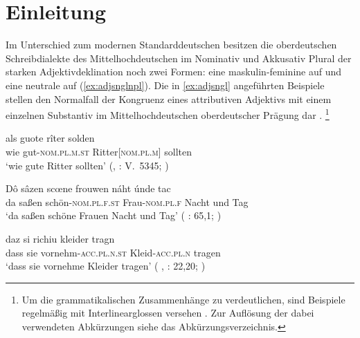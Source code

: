 \chapter{Einleitung}
\label{ch:einleitung}

Im Unterschied zum modernen Standarddeutschen besitzen die oberdeutschen
Schreib\-dialekte des Mittelhochdeutschen im Nominativ und Akkusativ Plural der
starken Adjektivdeklination noch zwei Formen: eine maskulin-feminine auf
  und eine neutrale auf
 (\ref{ex:adjsnglnpl}). Die in \cref{ex:adjsngl} angeführten
Beispiele stellen den Normalfall der Kongruenz eines attributiven Adjektivs mit
einem einzelnen Substantiv im Mittelhochdeutschen oberdeutscher Prägung dar
\autocites[vgl.][181--184]{ksw2}[200--203]{paul2007}.%
%
	\footnote{Um die grammatikalischen Zusammenhänge zu verdeutlichen, sind
		Beispiele regelmäßig mit Interlinear\-glossen versehen
		\autocite[vgl.][]{lgr}. Zur Auflösung der dabei verwendeten Abkürzungen
		siehe das Abkürzungsverzeichnis.}

\begin{exe}
\ex \label{ex:adjsngl}
	\begin{xlist}
	\ex \label{ex:adjsnglmpl}
		\gll als guote rîter solden \\
			wie gut-\textsc{nom.pl.m.st} Ritter[\textsc{nom.pl.m}] sollten \\
	\trans `wie gute Ritter sollten'
		(, : V.~5345;
			\cite[606]{mertens2004}%
		)

	\ex \label{ex:adjsnglfpl}
		\gll Dô sâzen scœne frouwen náht únde tac \\
			da saßen schön-\textsc{nom.pl.f.st} Frau-\textsc{nom.pl.f} Nacht 
			und	Tag \\
	\trans `da saßen schöne Frauen Nacht und Tag'
		(%
			: 65,1;
			\cite[16]{deboor1988}%
		)

	\ex \label{ex:adjsnglnpl}
		\gll daz si richiu kleider tragn \\
			dass sie vornehm-\textsc{acc.pl.n.st} Kleid-\textsc{acc.pl.n}
			tragen \\
		\trans `dass sie vornehme Kleider tragen'
			(%
				, : 22,20;
				\cite[24]{knechtschirok2003}%
			)
\end{xlist}
\end{exe}


